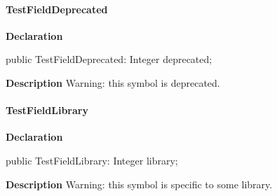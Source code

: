 \documentclass{report}
\begin{document}
\paragraph*{TestFieldDeprecated}\hspace*{\fill}

\begin{list}{}{
\setlength{\itemindent}{0cm}
\setlength{\listparindent}{0cm}
\setlength{\leftmargin}{\evensidemargin}
\addtolength{\leftmargin}{\tmplength}
\settowidth{\labelsep}{X}
\addtolength{\leftmargin}{\labelsep}
\setlength{\labelwidth}{\tmplength}
}
\begin{flushleft}
\item[\textbf{Declaration}\hfill]
\begin{ttfamily}
public TestFieldDeprecated: Integer deprecated;\end{ttfamily}


\end{flushleft}
\par
\item[\textbf{Description}]
Warning: this symbol is deprecated.

 

\end{list}
\paragraph*{TestFieldLibrary}\hspace*{\fill}

\begin{list}{}{
\setlength{\itemindent}{0cm}
\setlength{\listparindent}{0cm}
\setlength{\leftmargin}{\evensidemargin}
\addtolength{\leftmargin}{\tmplength}
\settowidth{\labelsep}{X}
\addtolength{\leftmargin}{\labelsep}
\setlength{\labelwidth}{\tmplength}
}
\begin{flushleft}
\item[\textbf{Declaration}\hfill]
\begin{ttfamily}
public TestFieldLibrary: Integer library;\end{ttfamily}


\end{flushleft}
\par
\item[\textbf{Description}]
Warning: this symbol is specific to some library.

 

\end{list}
\end{document}
